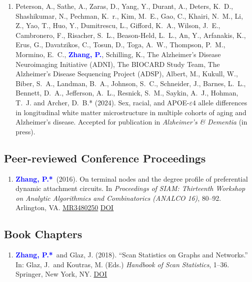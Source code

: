 \documentclass[12pt]{article}
\def \MR #1{\href{http://www.ams.org/mathscinet-getitem?mr=#1}{MR#1}}
\def \DOI #1{\href{http://doi.org/#1}{\underline{DOI}}}
\newcommand{\PZ}{\textcolor{blue}{\textbf{Zhang, P.*}}}
\newcommand{\PZnot}{\textcolor{blue}{\textbf{Zhang, P.}}}
\begin{document}
\begin{enumerate}
		\item {\sc Peterson, A., Sathe, A., Zaras, D., Yang, Y.,  
		Durant, A., Deters, K.\ D., Shashikumar, N., Pechman, K.\ 
		r., Kim, M.\ E., Gao, C., Khairi, N.\ M., Li, Z., Yao, T., 
		Huo, Y., Dumitrescu, L., Gifford, K.\ A., Wilson, J.\ E., 
		Cambronero, F., Risacher, S.\ L., Beason-Held, L.\ L., An, 
		Y., Arfanakis, K., Erus, G., Davatzikos, C., Tosun, D., 
		Toga, A.\ W., Thompson, P.\ M.,  Mormino, E.\ C.,} \PZnot, 
		{\sc Schilling, K., The Alzheimer’s Disease Neuroimaging 
		Initiative (ADNI), The BIOCARD Study Team, The Alzheimer’s 
		Disease Sequencing Project (ADSP), Albert, M., Kukull, W., 
		Biber, S.\ A., Landman, B.\ A., Johnson, S.\ C., Schneider, 
		J., Barnes, L.\ L., Bennett, D.\ A., Jefferson, A.\ L., 
		Resnick, S.\ M., Saykin, A.\ J., Hohman, T.\ J.} and {\sc 
		Archer, D.\ B.*} (2024). Sex, racial, and APOE-$\varepsilon 
		4$ allele differences in longitudinal white matter 
		microstructure in multiple cohorts of aging and Alzheimer’s 
		disease. Accepted for publication in {\em Alzheimer's \& 
		Dementia} (in press).
		
\end{enumerate} 
	
	\subsection*{Peer-reviewed Conference Proceedings}
	\begin{enumerate}
		\item \PZ\ (2016). On terminal nodes and the degree 
		profile of preferential dynamic attachment circuits. In 
		\emph{Proceedings of SIAM: Thirteenth Workshop on Analytic 
		Algorithmics and Combinatorics (ANALCO 16)}, 80--92. 
		Arlington, VA. \MR{3480250} \DOI{10.1137/1.9781611974324.9}
	\end{enumerate}
	
	\subsection*{Book Chapters}
	\begin{enumerate}
		\item \PZ\ and {\sc Glaz, J.} (2018). ``Scan 
		Statistics on Graphs and Networks.'' In: Glaz, J.\ and 
		Koutras, M. (Eds.) {\em Handbook of Scan Statistics}, 1--36. 
		Springer, New York, NY. 
		\DOI{10.1007/978-1-4614-8414-1_43-1}	
	\end{enumerate}
	
\end{document}

